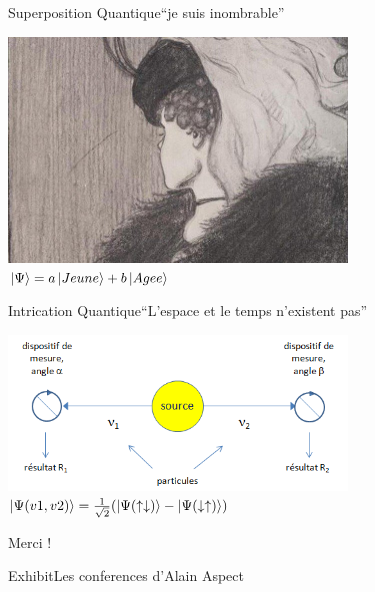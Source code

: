 \documentclass{beamer}
\begin{document}
\begin{frame}{Superposition Quantique}{``je suis inombrable''}
  \begin{center}
    \includegraphics[width=9cm]{3604843-inline.jpg}\\
    \vspace{0.5cm}
    $\ket{\Psi} = a \ket{Jeune} + b \ket{Agee}$ 
  \end{center}
\end{frame}

\begin{frame}{Intrication Quantique}{``L'espace et le temps n'existent pas''}
  \begin{center}
        \includegraphics[width=9cm]{intrication.png}\\
    \vspace{0.5cm}
    $\ket{\Psi(v1, v2)} = \frac{1}{\sqrt{2}}(\ket{\Psi(\uparrow\downarrow)} - \ket{\Psi(\downarrow\uparrow)})$
  \end{center}
\end{frame}


\begin{frame}
        Merci !
\end{frame}

\begin{frame}{Exhibit}{Les conferences d'Alain Aspect}

\end{frame}
\end{document}
